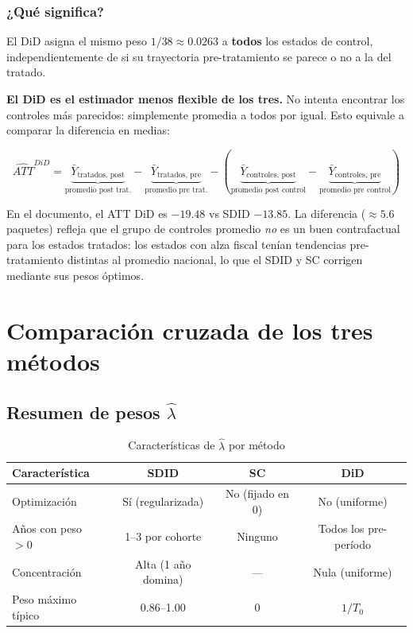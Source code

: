 \documentclass[11pt, a4paper]{article}
\begin{document}
\subsubsection*{¿Qué significa?}

El DiD asigna el mismo peso $1/38 \approx 0.0263$ a \textbf{todos} los estados de control,
independientemente de si su trayectoria pre-tratamiento se parece o no a la del tratado.

\begin{interpretacion}
\textbf{El DiD es el estimador menos flexible de los tres.} No intenta encontrar
los controles más parecidos: simplemente promedia a todos por igual.
Esto equivale a comparar la diferencia en medias:

\[
  \widehat{ATT}^{DiD} = \underbrace{\bar{Y}_{\text{tratados, post}}}_{\text{promedio post trat.}}
  - \underbrace{\bar{Y}_{\text{tratados, pre}}}_{\text{promedio pre trat.}}
  - \left(\underbrace{\bar{Y}_{\text{controles, post}}}_{\text{promedio post control}}
         - \underbrace{\bar{Y}_{\text{controles, pre}}}_{\text{promedio pre control}}\right)
\]

\medskip
En el documento, el ATT DiD es $-19.48$ vs SDID $-13.85$.
La diferencia ($\approx 5.6$ paquetes) refleja que el grupo de controles
promedio \textit{no} es un buen contrafactual para los estados tratados:
los estados con alza fiscal tenían tendencias pre-tratamiento distintas
al promedio nacional, lo que el SDID y SC corrigen mediante sus pesos óptimos.
\end{interpretacion}

\newpage
\section{Comparación cruzada de los tres métodos}

\subsection{Resumen de pesos $\hat{\lambda}$}

\begin{table}[H]
\centering
\caption{Características de $\hat{\lambda}$ por método}
\begin{tabular}{lccc}
\toprule
\textbf{Característica} & \textbf{SDID} & \textbf{SC} & \textbf{DiD} \\
\midrule
Optimización & Sí (regularizada) & No (fijado en 0) & No (uniforme) \\
Años con peso $>0$ & 1--3 por cohorte & Ninguno & Todos los pre-período \\
Concentración & Alta (1 año domina) & --- & Nula (uniforme) \\
Peso máximo típico & 0.86--1.00 & 0 & $1/T_0$ \\
\bottomrule
\end{tabular}
\end{table}
\end{document}

